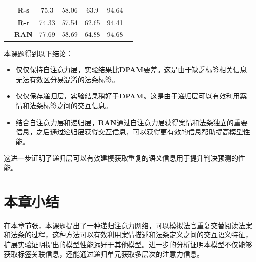 \begin{table}[htbp]
\begin{tabular}{ccccccc}
                                                                                        & \textbf{R-s}    & 75.3        & 58.06 & 63.9   & 94.64       \\
                                                                                        & \textbf{R-r}    & 74.33       & 57.54 & 62.65  & 94.41       \\
                                                                                        & \textbf{RAN}    & 77.69       & 58.69 & 64.88  & 94.68       \\ \hline
        \end{tabular}
\end{table}

本课题得到以下结论：\
\begin{itemize}
    \item 仅仅保持自注意力层，实验结果比\textbf{DPAM}要差。这是由于缺乏标签相关信息无法有效区分易混淆的法条标签。
    \item 仅仅保存递归层，实验结果稍好于\textbf{DPAM}。这是由于递归层可以有效利用案情和法条标签之间的交互信息。
    \item 结合自注意力层和递归层，\textbf{RAN}通过自注意力层获得案情和法条独立的重要信息，之后通过递归层获得交互信息，可以获得更有效的信息帮助提高模型性能。
\end{itemize}
这进一步证明了递归层可以有效建模获取重复的语义信息用于提升判决预测的性能。
\section{本章小结}
\label{sec:ran_conclu}
在本章节张，本课题提出了一种递归注意力网络，可以模拟法官重复交替阅读法案和法条的过程，这种方法可以有效利用案情描述和法条定义之间的交互语义特征，扩展实验证明提出的模型性能远好于其他模型。进一步的分析证明本模型不仅能够获取标签关联信息，还能通过递归单元获取多层次的注意力信息。

